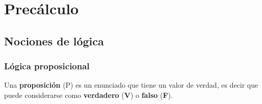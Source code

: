 %
%
%

\part{Precálculo}

\chapter{Nociones de lógica}

\section{Lógica proposicional}

\begin{definition}
Una \textbf{proposición} (P)  es un enunciado que tiene un valor de verdad, es decir que puede considerarse como \textbf{verdadero} (\textbf{V}) o \textbf{falso} (\textbf{F}).
\end{definition}

